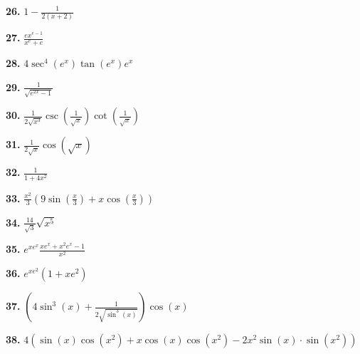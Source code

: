 \documentclass[12pt,]{book}
\theoremstyle{plain}
\theoremstyle{definition}
\numberwithin{equation}{section}
\newcommand{\fe}[2]{#1\mathopen{}\left(#2\right)\mathclose{}}
\begin{document}
                \par\smallskip
\noindent\textbf{26.}\quad{}
                    \(1-\frac{1}{2(x+2)}\)%

                \par\smallskip
\noindent\textbf{27.}\quad{}
                    \(\frac{ex^{e-1}}{x^e+e}\)%

                \par\smallskip
\noindent\textbf{28.}\quad{}
                    \(4\fe{\sec^4}{e^x}\fe{\tan}{e^x}e^x\)%

                \par\smallskip
\noindent\textbf{29.}\quad{}
                    \(\frac{1}{\sqrt{e^{2x}-1}}\)%

                \par\smallskip
\noindent\textbf{30.}\quad{}
                    \(\frac{1}{2\sqrt{x^3}}\fe{\csc}{\frac{1}{\sqrt{x}}}\fe{\cot}{\frac{1}{\sqrt{x}}}\)%

                \par\smallskip
\noindent\textbf{31.}\quad{}
                    \(\frac{1}{2\sqrt{x}}\fe{\cos}{\sqrt{x}}\)%

                \par\smallskip
\noindent\textbf{32.}\quad{}
                    \(\frac{1}{1+4x^2}\)%

                \par\smallskip
\noindent\textbf{33.}\quad{}
                    \(\frac{x^2}{3}\left(9\fe{\sin}{\frac{x}{3}}+x\fe{\cos}{\frac{x}{3}}\right)\)%

                \par\smallskip
\noindent\textbf{34.}\quad{}
                    \(\frac{14}{\sqrt{3}}\sqrt{x^5}\)%

                \par\smallskip
\noindent\textbf{35.}\quad{}
                    \(e^{xe^x}\frac{xe^x+x^2e^x-1}{x^2}\)%

                \par\smallskip
\noindent\textbf{36.}\quad{}
                    \(e^{xe^2}\left(1+xe^2\right)\)%

                \par\smallskip
\noindent\textbf{37.}\quad{}
                    \(\left(4\fe{\sin^3}{x}+\frac{1}{2\sqrt{\fe{\sin^3}{x}}}\right)\fe{\cos}{x}\)%

                \par\smallskip
\noindent\textbf{38.}\quad{}
                    \(4\left(\fe{\sin}{x}\fe{\cos}{x^2}+x\fe{\cos}{x}\fe{\cos}{x^2}-2x^2\fe{\sin}{x}\cdot\fe{\sin}{x^2}\right)\)%
\end{document}
